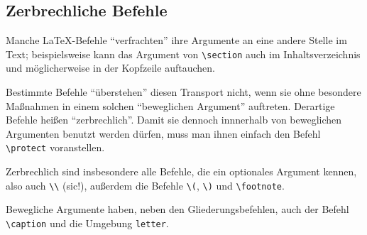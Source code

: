  
\subsection{Zerbrechliche Befehle}
 
Manche \LaTeX-Befehle "`verfrachten"' ihre Argumente an eine andere
Stelle im Text; beispielsweise kann das Argument von \verb|\section|
auch im Inhaltsverzeichnis und möglicherweise in der Kopfzeile auftauchen.  

Bestimmte Befehle "`überstehen"' diesen Transport nicht, wenn sie
ohne besondere Maßnahmen in einem solchen "`beweglichen Argument"'
auftreten.
Derartige Befehle heißen "`zerbrechlich"'.  Damit sie dennoch innnerhalb
von beweglichen Argumenten benutzt werden dürfen, 
muss man ihnen einfach den Befehl \verb|\protect| voranstellen.

Zerbrechlich sind insbesondere alle Befehle, die ein optionales Argument
kennen, also auch \verb|\\| (sic!),
außerdem die Befehle \verb|\(|, \verb|\)| und \verb|\footnote|.

Bewegliche Argumente haben, neben den Gliederungsbefehlen,
auch der Befehl \verb|\caption| und die Umgebung \texttt{letter}.


\endinput
